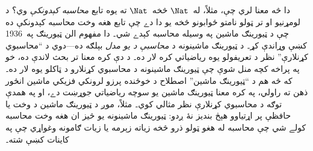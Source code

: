 \documentclass[../../../include/open-logic-section]{subfiles}
\begin{document}

دا څه معنا لري چې، مثلاً، له~$\Nat$ څخه~$\Nat$ ته يوه تابع
\emph{محاسبه کېدونکې} وي؟ د لومړنيو او تر ټولو نامتو ځوابونو څخه يو
دا دے چې تابع هغه وخت محاسبه کېدونکې ده چې د ټيورينګ ماشين په وسيله
محاسبه کېدے شي۔ دا مفهوم الن ټيورينګ په~1936 کښې وړاندې کړ۔ د ټيورينګ
ماشينونه د \emph{محاسبې د يو مدل} بېلګه ده---دوي د ``محاسبوي کړنلارې''
نظر د تعريفولو يوه رياضياتي کره لار ده۔ د دې کره معنا تر بحث لاندې
ده، خو په پراخه کچه منل شوې چې ټيورينګ ماشينونه د محاسبوي کړنلارو د
ټاکلو يوه لار ده۔ که څه هم د ``ټيورينګ ماشين'' اصطلاح د خوځنده پرزو
لرونکي فزيکي ماشين انځور ذهن ته راولي، په کره معنا ټيورينګ ماشين يو
سوچه رياضياتي جوړښت دے، او په همدې توګه د محاسبوي کړنلارې نظر مثالي
کوي۔ مثلاً، موږ د ټيورينګ ماشين د وخت يا حافظې پر اړتياوو هېڅ بنديز
نۀ ږدو: ټيورينګ ماشينونه يو څيز ان هغه وخت محاسبه کولے شي چې محاسبه
له هغو ټولو ذرو څخه زياته زېرمه يا زيات ګامونه وغواړي چې په کاينات
کښې شته۔
\end{document}
